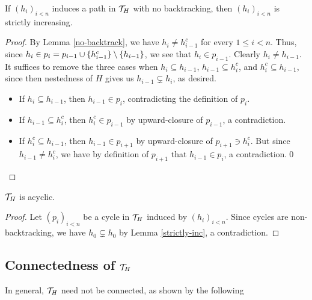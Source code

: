 \documentclass{amsart}
\begin{document}
    \begin{lemma}\label{strictly-inc}
        If $(h_i)_{i<n}$ induces a path in $\mathcal{T}_H$ with no backtracking, then $(h_i)_{i<n}$ is strictly increasing.
    \end{lemma}
    \begin{proof}
        By Lemma \ref{no-backtrack}, we have $h_i\neq h_{i-1}^c$ for every $1\leq i<n$. Thus, since $h_i\in p_i=p_{i-1}\cup\{h_{i-1}^c\}\setminus\left\{h_{i-1}\right\}$, we see that $h_i\in p_{i-1}$. Clearly $h_i\neq h_{i-1}$. It suffices to remove the three cases when $h_i\subseteq h_{i-1}$, $h_{i-1}\subseteq h_i^c$, and $h_i^c\subseteq h_{i-1}$, since then nestedness of $H$ gives us $h_{i-1}\subsetneq h_i$, as desired.
        \begin{itemize}
            \item If $h_i\subseteq h_{i-1}$, then $h_{i-1}\in p_i$, contradicting the definition of $p_i$.
            \item If $h_{i-1}\subseteq h_i^c$, then $h_i^c\in p_{i-1}$ by upward-closure of $p_{i-1}$, a contradiction.
            \item If $h_i^c\subseteq h_{i-1}$, then $h_{i-1}\in p_{i+1}$ by upward-closure of $p_{i+1}\ni h_i^c$. But since $h_{i-1}\neq h_i^c$, we have by definition of $p_{i+1}$ that $h_{i-1}\in p_i$, a contradiction.\qed
        \end{itemize}
    \end{proof}

    \begin{proposition}\label{acyclic}
        $\mathcal{T}_H$ is acyclic.
    \end{proposition}
    \begin{proof}
        Let $(p_i)_{i<n}$ be a cycle in $\mathcal{T}_H$ induced by $(h_i)_{i<n}$. Since cycles are non-backtracking, we have $h_0\subsetneq h_0$ by Lemma \ref{strictly-inc}, a contradiction.
    \end{proof}

    \subsection{Connectedness of $\mathcal{T}_H$}

    In general, $\mathcal{T}_H$ need not be connected, as shown by the following
\end{document}
